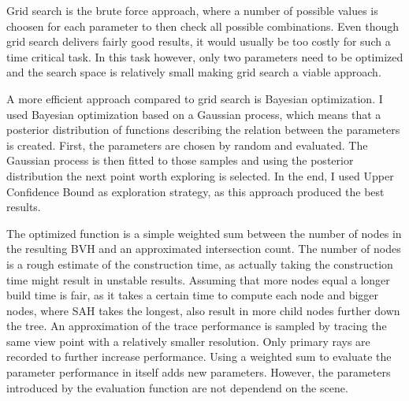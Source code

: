Grid search is the brute force approach, where a number of possible values is choosen for each parameter to then check all possible combinations. Even though grid search delivers fairly good results, it would usually be too costly for such a time critical task. In this task however, only two parameters need to be optimized and the search space is relatively small making grid search a viable approach. 

A more efficient approach compared to grid search is Bayesian optimization. I used Bayesian optimization based on a Gaussian process, which means that a posterior distribution of functions describing the relation between the parameters is created. First, the parameters are chosen by random and evaluated. The Gaussian process is then fitted to those samples and using the posterior distribution the next point worth exploring is selected. In the end, I used Upper Confidence Bound as exploration strategy, as this approach produced the best results. 

The optimized function is a simple weighted sum between the number of nodes in the resulting BVH and an approximated intersection count. The number of nodes is a rough estimate of the construction time, as actually taking the construction time might result in unstable results. Assuming that more nodes equal a longer build time is fair, as it takes a certain time to compute each node and bigger nodes, where SAH takes the longest, also result in more child nodes further down the tree. An approximation of the trace performance is sampled by tracing the same view point with a relatively smaller resolution. Only primary rays are recorded to further increase performance. 
Using a weighted sum to evaluate the parameter performance in itself adds new parameters. However, the parameters introduced by the evaluation function are not dependend on the scene. %
